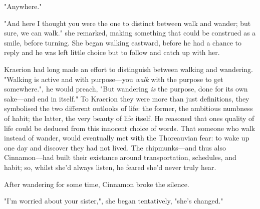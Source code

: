 "Anywhere."

"And here I thought you were the one to distinct between walk and wander; but sure, we can walk." she remarked, making something that could be construed as a smile, before turning. She began walking eastward, before he had a chance to reply and he was left little choice but to follow and catch up with her.

Kraerion had long made an effort to distinguish between walking and wandering. "Walking is active and with purpose---you \textit{walk} with the purpose to get somewhere.", he would preach, "But wandering \textit{is} the purpose, done for its own sake---and end in itself." To Kraerion they were more than just definitions, they symbolised the two different outlooks of life: the former, the ambitious numbness of habit; the latter, the very beauty of life itself. He reasoned that ones quality of life could be deduced from this innocent choice of words. That someone who walk instead of wander, would eventually met with the Thoreauvian fear: to wake up one day and discover they had not lived. The chipmunks---and thus also Cinnamon---had built their existance around transportation, schedules, and habit; so, whilst she'd always listen, he feared she'd never truly hear.

After wandering for some time, Cinnamon broke the silence. 

"I'm worried about your sister,", she began tentatively, "she's changed."





